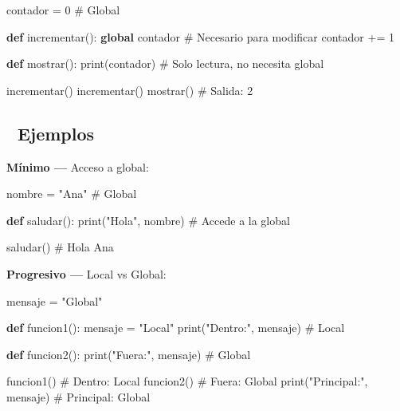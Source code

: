 \documentclass[
  doc,
  floatsintext,
  longtable,
  a4paper,
  nolmodern,
  notxfonts,
  notimes,
  12pt,
  colorlinks=true,linkcolor=blue,citecolor=blue,urlcolor=blue]{apa7}
\newenvironment{Shaded}{\begin{snugshade}}{\end{snugshade}}
\newcommand{\BuiltInTok}[1]{\textcolor[rgb]{0.00,0.23,0.31}{#1}}
\newcommand{\CommentTok}[1]{\textcolor[rgb]{0.37,0.37,0.37}{#1}}
\newcommand{\DecValTok}[1]{\textcolor[rgb]{0.68,0.00,0.00}{#1}}
\newcommand{\KeywordTok}[1]{\textcolor[rgb]{0.00,0.23,0.31}{\textbf{#1}}}
\newcommand{\NormalTok}[1]{\textcolor[rgb]{0.00,0.23,0.31}{#1}}
\newcommand{\OperatorTok}[1]{\textcolor[rgb]{0.37,0.37,0.37}{#1}}
\newcommand{\StringTok}[1]{\textcolor[rgb]{0.13,0.47,0.30}{#1}}
\begin{document}
\begin{Shaded}
\begin{Highlighting}[]
\NormalTok{contador }\OperatorTok{=} \DecValTok{0}  \CommentTok{\# Global}

\KeywordTok{def}\NormalTok{ incrementar():}
    \KeywordTok{global}\NormalTok{ contador  }\CommentTok{\# Necesario para modificar}
\NormalTok{    contador }\OperatorTok{+=} \DecValTok{1}

\KeywordTok{def}\NormalTok{ mostrar():}
    \BuiltInTok{print}\NormalTok{(contador)  }\CommentTok{\# Solo lectura, no necesita global}

\NormalTok{incrementar()}
\NormalTok{incrementar()}
\NormalTok{mostrar()  }\CommentTok{\# Salida: 2}
\end{Highlighting}
\end{Shaded}

\subsection{🔬 Ejemplos}\label{ejemplos}

\textbf{Mínimo ---} Acceso a global:

\begin{Shaded}
\begin{Highlighting}[]
\NormalTok{nombre }\OperatorTok{=} \StringTok{"Ana"}  \CommentTok{\# Global}

\KeywordTok{def}\NormalTok{ saludar():}
    \BuiltInTok{print}\NormalTok{(}\StringTok{"Hola"}\NormalTok{, nombre)  }\CommentTok{\# Accede a la global}

\NormalTok{saludar()  }\CommentTok{\# Hola Ana}
\end{Highlighting}
\end{Shaded}

\textbf{Progresivo ---} Local vs Global:

\begin{Shaded}
\begin{Highlighting}[]
\NormalTok{mensaje }\OperatorTok{=} \StringTok{"Global"}

\KeywordTok{def}\NormalTok{ funcion1():}
\NormalTok{    mensaje }\OperatorTok{=} \StringTok{"Local"}
    \BuiltInTok{print}\NormalTok{(}\StringTok{"Dentro:"}\NormalTok{, mensaje)  }\CommentTok{\# Local}

\KeywordTok{def}\NormalTok{ funcion2():}
    \BuiltInTok{print}\NormalTok{(}\StringTok{"Fuera:"}\NormalTok{, mensaje)  }\CommentTok{\# Global}

\NormalTok{funcion1()  }\CommentTok{\# Dentro: Local}
\NormalTok{funcion2()  }\CommentTok{\# Fuera: Global}
\BuiltInTok{print}\NormalTok{(}\StringTok{"Principal:"}\NormalTok{, mensaje)  }\CommentTok{\# Principal: Global}
\end{Highlighting}
\end{Shaded}
\end{document}
